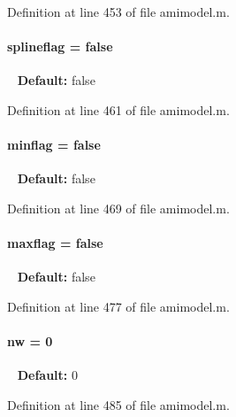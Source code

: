 Definition at line 453 of file amimodel.\+m.

\hypertarget{classamimodel_abea45d67286ebbf35dcbc12e335ffd51}{}
\paragraph[{splineflag}]{\setlength{\rightskip}{0pt plus 5cm}splineflag = false}\label{classamimodel_abea45d67286ebbf35dcbc12e335ffd51}
~\newline
{\bfseries Default\+:} false 

Definition at line 461 of file amimodel.\+m.

\hypertarget{classamimodel_affead4b7a87bc135fea91fd5aada78a8}{}
\paragraph[{minflag}]{\setlength{\rightskip}{0pt plus 5cm}minflag = false}\label{classamimodel_affead4b7a87bc135fea91fd5aada78a8}
~\newline
{\bfseries Default\+:} false 

Definition at line 469 of file amimodel.\+m.

\hypertarget{classamimodel_a1a65e7157ae2262cfa11a783b018364f}{}
\paragraph[{maxflag}]{\setlength{\rightskip}{0pt plus 5cm}maxflag = false}\label{classamimodel_a1a65e7157ae2262cfa11a783b018364f}
~\newline
{\bfseries Default\+:} false 

Definition at line 477 of file amimodel.\+m.

\hypertarget{classamimodel_a371815f74d602ff1338376abbd1278e4}{}
\paragraph[{nw}]{\setlength{\rightskip}{0pt plus 5cm}nw = 0}\label{classamimodel_a371815f74d602ff1338376abbd1278e4}
~\newline
{\bfseries Default\+:} 0 

Definition at line 485 of file amimodel.\+m.

